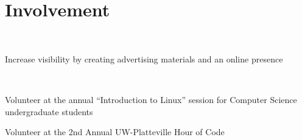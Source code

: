 \documentclass[]{hieudo-build}
\begin{document}
\begin{minipage}[t]{0.65\textwidth}


\section{Involvement}

 \\
\begin{tightemize}
\item Increase visibility by creating advertising materials and an online presence
\end{tightemize}
\sectionsep

 \\
\begin{tightemize}
\item Volunteer at the annual “Introduction to Linux” session for Computer Science undergraduate students
\item Volunteer at the 2nd Annual UW-Platteville Hour of Code
\end{tightemize}
\sectionsep


\end{minipage}
\end{document}
